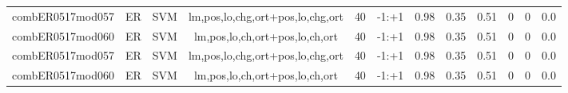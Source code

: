 \documentclass[a4paper]{article}
\begin{document}
\begin{landscape}
\begin{center}
\begin{tabular}{ |c|c|c|c|c|c|c|c|c|c|c|c|}
 	
 
 	
 		
 		\small{ combER0517mod057 } & ER & SVM & lm,pos,lo,chg,ort+pos,lo,chg,ort  &  40 &  -1:+1  &  0.98 & 0.35 & 0.51  &  0 & 0 & 0.0 \\
 		

 	
 
 	
 		
 		\small{ combER0517mod060 } & ER & SVM & lm,pos,lo,ch,ort+pos,lo,ch,ort  &  40 &  -1:+1  &  0.98 & 0.35 & 0.51  &  0 & 0 & 0.0 \\
 		

 	
 
 	
 		
 		\small{ combER0517mod057 } & ER & SVM & lm,pos,lo,chg,ort+pos,lo,chg,ort  &  40 &  -1:+1  &  0.98 & 0.35 & 0.51  &  0 & 0 & 0.0 \\
 		

 	
 
 	
 		
 		\small{ combER0517mod060 } & ER & SVM & lm,pos,lo,ch,ort+pos,lo,ch,ort  &  40 &  -1:+1  &  0.98 & 0.35 & 0.51  &  0 & 0 & 0.0 \\
 		

 	
 
 	
 
 	
 
 	
 
 	
 
 	
 
 	
 
 	
 
 	
 
 	
 
 	
 
 	
 
 	
 
 	
 
 	
 
 	
 
 	
 
 	
 
 	
 
 	
 
 	
 
 	
 
 	
 
 	
 
 	
 
 	
 
 	
 
 	
 
 	
 
 	
 
 	
 

\end{tabular}
\end{center}
\end{landscape}
\end{document}
